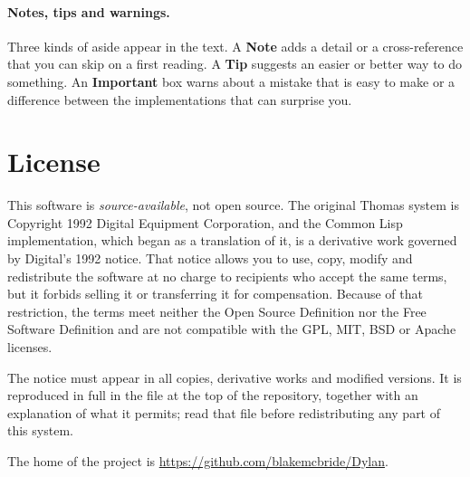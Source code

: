 \paragraph{Notes, tips and warnings.} Three kinds of aside appear in the
text. A \textbf{Note} adds a detail or a cross-reference that you can skip
on a first reading. A \textbf{Tip} suggests an easier or better way to do
something. An \textbf{Important} box warns about a mistake that is easy to
make or a difference between the implementations that can surprise you.

\section{License}\label{sec:intro-license}

This software is \emph{source-available}, not open source. The original
Thomas system is Copyright 1992 Digital Equipment Corporation, and the
Common Lisp implementation, which began as a translation of it, is a
derivative work governed by Digital's 1992 notice. That notice allows you
to use, copy, modify and redistribute the software at no charge to
recipients who accept the same terms, but it forbids selling it or
transferring it for compensation. Because of that restriction, the terms
meet neither the Open Source Definition nor the Free Software Definition
and are not compatible with the GPL, MIT, BSD or Apache licenses.

The notice must appear in all copies, derivative works and modified
versions. It is reproduced in full in the file  at the top of
the repository, together with an explanation of what it permits; read that
file before redistributing any part of this system.

The home of the project is \url{https://github.com/blakemcbride/Dylan}.
